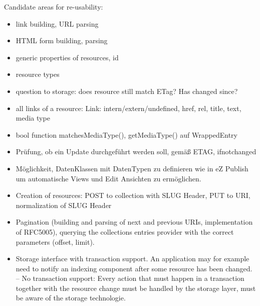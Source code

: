 \documentclass[12pt,a4paper]{scrartcl}		%
\begin{document}
Candidate areas for re-usability:
\begin{itemize}
\item link building, URL parsing
\item HTML form building, parsing
\item generic properties of resources, id
\item resource types
\item question to storage: does resource still match ETag? Has changed since?
\item all links of a resource: Link: intern/extern/undefined, href, rel, title, text, media type
\item bool function matchesMediaType(), getMediaType() auf WrappedEntry
\item Prüfung, ob ein Update durchgeführt werden soll, gemäß ETAG, ifnotchanged
\item Möglichkeit, DatenKlassen mit DatenTypen zu definieren wie in eZ Publish um automatische Views und Edit Ansichten zu ermöglichen.
\item Creation of resources: POST to collection with SLUG Header, PUT to URI, normalization of SLUG Header
\item Pagination (building and parsing of next and previous URIs, implementation of RFC5005), querying the collections entries provider with the correct parameters (offset, limit).
\item Storage interface with transaction support. An application may for example need to notify an indexing component after some resource has been changed. -- No transaction support: Every action that must happen in a transaction together with the resource change must be handled by the storage layer, must be aware of the storage technologie.
\end{itemize}




{}

\end{document}
